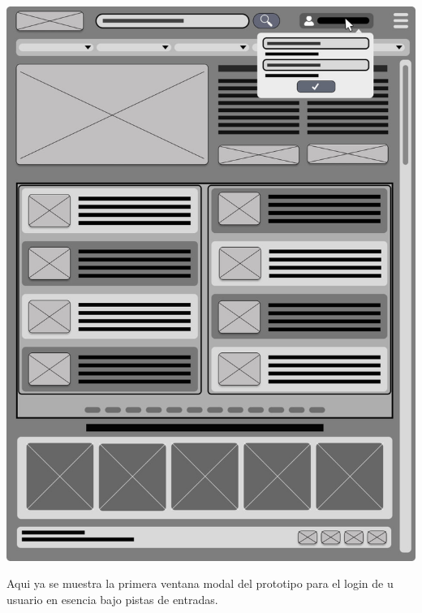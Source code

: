 \documentclass[a4paper,12pt]{article}
\begin{document}
\begin{itemize}
\par \includegraphics[scale=0.85]{m3} \par

Aqui ya se muestra la primera ventana modal del prototipo para el login de u usuario en esencia bajo pistas de entradas.


\end{itemize}
\end{document}
